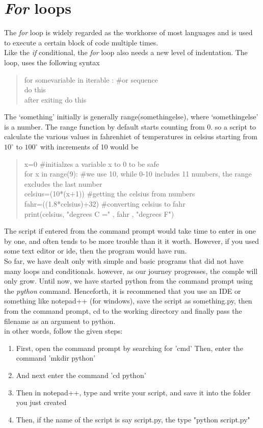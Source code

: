 \section{\emph{For} loops}
The \emph{for} loop is widely regarded as the workhorse of most languages and is used to execute a certain block of code multiple times.\\
Like the \emph{if} conditional, the \emph{for} loop also needs a new level of indentation. The loop, uses the following syntax
\begin{quote}
for somevariable in iterable : \#or sequence\\
\tab do this\\
after exiting do this
\end{quote}
The `something' initially is generally range(somethingelse), where `somethingelse' is a number. The range function by default starts counting from 0.
so a script to calculate the various values in fahrenhiet of temperatures in celsius starting from $10^\circ$ to $100^\circ$ with increments of 10 would be
\begin{quote}
x=0 \tab \#initialzes a variable x to 0 to be safe\\
for x in range(9): \tab \#we use 10, while 0-10 includes 11 numbers, the range excludes the last number\\
\tab celsius=(10*(x+1)) \tab \#getting the celsius from numbers\\
\tab fahr=((1.8*celsius)+32) \tab \#converting celsius to fahr\\
\tab print(celsius, "degrees C =" , fahr , "degrees F")
\end{quote}
The script if entered from the command prompt would take time to enter in one by one, and often tends to be more trouble than it it worth. However, if you used some text editor or ide, then the program would have run.\\
So far, we have dealt only with simple and basic programs that did not have many loops and conditionals. however, as our journey progresses, the comple will only grow. Until now, we have started python from the command prompt using the \emph{python} command. Henceforth, it is recommened that you use an IDE or something like notepad++ (for windows), save the script as something.py, then from the command prompt, cd to the working directory and finally pass the filename as an argument to python.\\ 
in other words, follow the given steps:
\begin{enumerate}
\item First, open the command prompt by searching for 'cmd'
\iem  Then, enter the command 'mkdir python'
\item And next enter the command 'cd python'
\item Then in notepad++, type and write your script, and save it into the folder you just created
\item Then, if the name of the script is say script.py, the type "python script.py"
\end{enumerate}
\newpage
